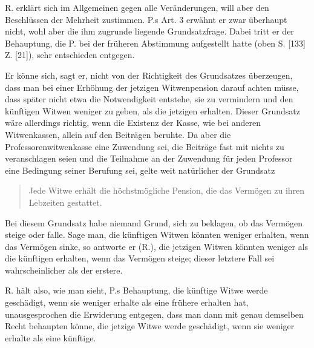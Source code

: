R. erklärt sich im Allgemeinen gegen alle Veränderungen, will aber den Beschlüssen der Mehrheit zustimmen. P.s Art. 3 erwähnt er zwar überhaupt nicht, wohl aber die ihm zugrunde liegende Grundsatzfrage. Dabei tritt er der Behauptung, die P. bei der früheren Abstimmung aufgestellt hatte (oben S. [133] Z. [21]), sehr entschieden entgegen.

Er könne sich, sagt er, nicht von der Richtigkeit des Grundsatzes überzeugen, dass man bei einer Erhöhung der jetzigen Witwenpension darauf achten müsse, dass später nicht etwa die Notwendigkeit entstehe, sie zu vermindern und den künftigen Witwen weniger zu geben, als die jetzigen erhalten. Dieser Grundsatz wäre allerdings richtig, wenn die Existenz der Kasse, wie bei anderen Witwenkassen, allein auf den Beiträgen beruhte. Da aber die Professorenwitwenkasse eine Zuwendung sei, die Beiträge fast mit nichts zu veranschlagen seien und die Teilnahme an der Zuwendung für jeden Professor eine Bedingung seiner Berufung sei, gelte weit natürlicher der Grundsatz
\begin{quote}
Jede Witwe erhält die höchstmögliche Pension, die das Vermögen zu ihren Lebzeiten gestattet.
\end{quote}
\par{}
Bei diesem Grundsatz habe niemand Grund, sich zu beklagen, ob das Vermögen steige oder falle. Sage man, die künftigen Witwen könnten weniger erhalten, wenn das Vermögen sinke, so antworte er (R.), die jetzigen Witwen könnten weniger als die künftigen erhalten, wenn das Vermögen steige; dieser letztere Fall sei wahrscheinlicher als der erstere.

R. hält also, wie man sieht, P.s Behauptung, die künftige Witwe werde geschädigt, wenn sie weniger erhalte als eine frühere erhalten hat, unausgesprochen die Erwiderung entgegen, dass man dann mit genau demselben Recht behaupten könne, die jetzige Witwe werde geschädigt, wenn sie weniger erhalte als eine künftige.

